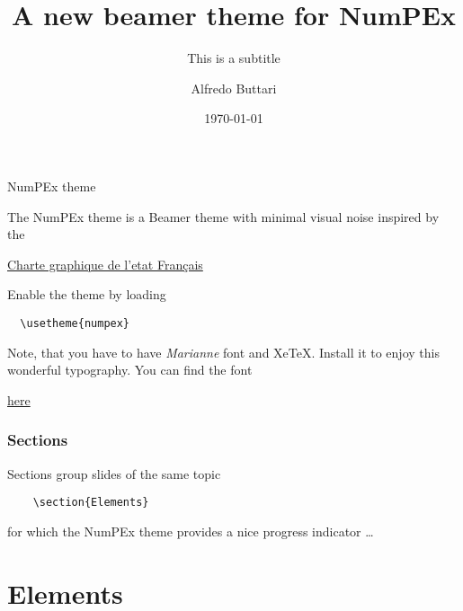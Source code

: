 \documentclass[aspectratio=169]{beamer}
\title{A new beamer theme for NumPEx}
\subtitle{This is a subtitle}
\date{\today}
\author{Alfredo Buttari}
\institute{Institute or miscellaneous information}
\begin{document}
\maketitle

\begin{frame}[fragile]{NumPEx theme}

  The NumPEx theme is a Beamer theme with minimal visual noise
  inspired by the

  \vspace{0.1cm}

  \begin{center}
    \alert{\href{https://www.info.gouv.fr/marque-de-letat}{Charte
        graphique de l'etat Français}}
  \end{center}

  \vspace{0.4cm}

  Enable the theme by loading

\begin{verbatim}
  \usetheme{numpex}
\end{verbatim}

  \vspace{0.4cm}

  Note, that you have to have \emph{Marianne} font and XeTeX.
  Install it to enjoy this wonderful typography. You can find the font

  \vspace{0.1cm}

  \begin{center}
    \alert{\href{https://www.systeme-de-design.gouv.fr/elements-d-interface/fondamentaux-de-l-identite-de-l-etat/typographie/}{here}}
  \end{center}
\end{frame}

\begin{frame}[fragile]
  \frametitle{Sections}

  Sections group slides of the same topic

\begin{verbatim}
    \section{Elements}
\end{verbatim}

  for which the NumPEx theme provides a nice progress indicator \ldots
\end{frame}

\section{Elements}
\end{document}
